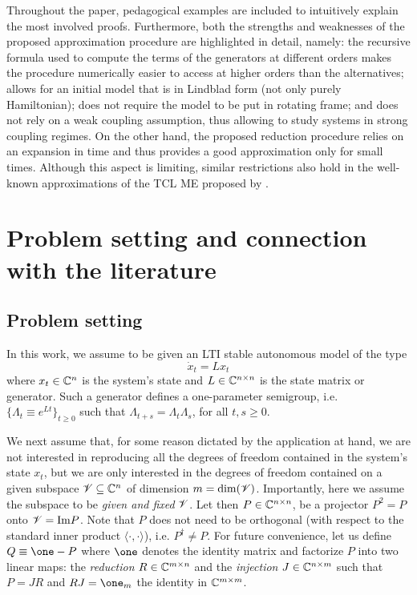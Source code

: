 \documentclass[10pt,aps,pra,twocolumn,showpacs,superscriptaddress,nobalancelastpage,notitlepage,nofootinbib,longbibliography]{revtex4-2}
\begin{document}
Throughout the paper, pedagogical examples are included to intuitively explain the most involved proofs. Furthermore, both the strengths and weaknesses of the proposed approximation procedure are highlighted in detail, namely: the recursive formula used to compute the terms of the generators at different orders makes the procedure numerically easier to access at higher orders than the alternatives; allows for an initial model that is in Lindblad form (not only purely Hamiltonian); does not require the model to be put in rotating frame; and does not rely on a weak coupling assumption, thus allowing to study systems in strong coupling regimes. On the other hand, the proposed reduction procedure relies on an expansion in time and thus provides a good approximation only for small times. Although this aspect is limiting, similar restrictions also hold in the well-known approximations of the TCL ME proposed by \cite{shibata_generalized_1977}.

\section{Problem setting and connection with the literature}
\label{sec:problem_setting}
\subsection{Problem setting}

In this work, we assume to be given an LTI stable autonomous model of the type 
\begin{equation}
    \dot{x}_t = L x_t
    \label{eq:original_model_linear}
\end{equation}
where $x_t\in\mathbb{C}^n$ is the system's state and $L\in\mathbb{C}^{n\times n}$ is the state matrix or generator. Such a generator defines a one-parameter semigroup, i.e. $\{\Lambda_t \equiv e^{L t}\}_{t\geq 0}$ such that $\Lambda_{t+s} =\Lambda_t\Lambda_s$, for all $t,s\geq0$.

We next assume that, for some reason dictated by the application at hand, we are not interested in reproducing all the degrees of freedom contained in the system's state $x_t$, but we are only interested in the degrees of freedom contained on a given subspace $\mathscr{V}\subseteq\mathbb{C}^n$ of dimension $m=\dim(\mathscr{V})$. Importantly, here we assume the subspace to be {\em given and fixed} $\mathscr{V}$.
Let then $P\in\mathbb{C}^{n\times n}$, be a projector $P^2=P$ onto $\mathscr{V}={\rm Im}P$. Note that $P$ does not need to be orthogonal (with respect to the standard inner product $\langle\cdot,\cdot\rangle$), i.e. $P^\dag \neq P$. For future convenience, let us define $Q\equiv \one-P$ where $\one$ denotes the identity matrix and factorize $P$ into two linear maps: the {\em reduction} $R\in\mathbb{C}^{m\times n}$ and the {\em injection} $J\in\mathbb{C}^{n\times m}$ such that $P=JR$ and $RJ = \one_m$ the identity in $\mathbb{C}^{m\times m}$. 
\end{document}
